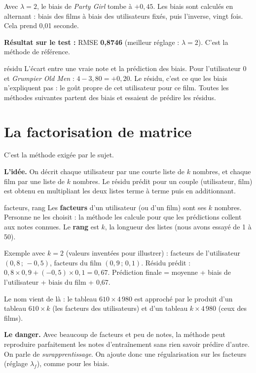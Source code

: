 \documentclass[11pt,a4paper]{article}
\newcommand{\resultat}[1]{\par\textbf{Résultat sur le test :} #1\par}
\begin{document}
Avec $\lambda = 2$, le biais de \emph{Party Girl} tombe à $+0{,}45$. Les biais sont
calculés en alternant : biais des films à biais des utilisateurs fixés, puis l'inverse,
vingt fois. Cela prend 0,01 seconde.

\resultat{RMSE \textbf{0,8746} (meilleur réglage : $\lambda = 2$). C'est la méthode de
référence.}

\begin{definition}{résidu}
L'écart entre une vraie note et la prédiction des biais. Pour l'utilisateur 0 et
\emph{Grumpier Old Men} : $4 - 3{,}80 = +0{,}20$. Le résidu, c'est ce que les biais
n'expliquent pas : le goût propre de cet utilisateur pour ce film. Toutes les méthodes
suivantes partent des biais et essaient de prédire les résidus.
\end{definition}

\section{La factorisation de matrice}\label{sec:mf}

C'est la méthode exigée par le sujet.

\textbf{L'idée.} On décrit chaque utilisateur par une courte liste de $k$ nombres, et
chaque film par une liste de $k$ nombres. Le résidu prédit pour un couple (utilisateur,
film) est obtenu en multipliant les deux listes terme à terme puis en additionnant.

\begin{definition}{facteurs, rang}
Les \textbf{facteurs} d'un utilisateur (ou d'un film) sont ses $k$ nombres. Personne ne
les choisit : la méthode les calcule pour que les prédictions collent aux notes connues.
Le \textbf{rang} est $k$, la longueur des listes (nous avons essayé de 1 à 50).
\end{definition}

Exemple avec $k = 2$ (valeurs inventées pour illustrer) : facteurs de l'utilisateur
$(0{,}8 \,;\, -0{,}5)$, facteurs du film $(0{,}9 \,;\, 0{,}1)$. Résidu prédit :
$0{,}8 \times 0{,}9 + (-0{,}5) \times 0{,}1 = 0{,}67$. Prédiction finale = moyenne + biais
de l'utilisateur + biais du film + 0,67.

Le nom vient de là : le tableau $610 \times 4\,980$ est approché par le produit d'un
tableau $610 \times k$ (les facteurs des utilisateurs) et d'un tableau $k \times 4\,980$
(ceux des films).

\textbf{Le danger.} Avec beaucoup de facteurs et peu de notes, la méthode peut reproduire
parfaitement les notes d'entraînement sans rien savoir prédire d'autre. On parle de
\emph{surapprentissage}. On ajoute donc une régularisation sur les facteurs (réglage
$\lambda_f$), comme pour les biais.
\end{document}
